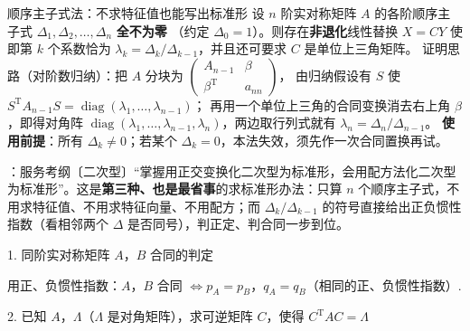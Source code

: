 \begin{fdeep}{顺序主子式法：不求特征值也能写出标准形}
设 $n$ 阶实对称矩阵 $A$ 的各阶顺序主子式 $\Delta_1,\Delta_2,\dots,\Delta_n$ \textbf{全不为零}
（约定 $\Delta_0=1$）。则存在\textbf{非退化}线性替换 $X=CY$ 使
即第 $k$ 个系数恰为 $\lambda_k=\Delta_k/\Delta_{k-1}$，并且还可要求 $C$ 是单位上三角矩阵。
证明思路（对阶数归纳）：把 $A$ 分块为 $\begin{pmatrix}A_{n-1}&\beta\\ \beta^{\mathrm T}&a_{nn}\end{pmatrix}$，
由归纳假设有 $S$ 使 $S^{\mathrm T}A_{n-1}S=\operatorname{diag}(\lambda_1,\dots,\lambda_{n-1})$；
再用一个单位上三角的合同变换消去右上角 $\beta$，即得对角阵
$\operatorname{diag}(\lambda_1,\dots,\lambda_{n-1},\lambda_n)$，两边取行列式就有
$\lambda_n=\Delta_n/\Delta_{n-1}$。
\textbf{使用前提}：所有 $\Delta_k\ne0$；若某个 $\Delta_k=0$，本法失效，须先作一次合同置换再试。

\fbref{}：服务考纲〔二次型〕“掌握用正交变换化二次型为标准形，会用配方法化二次型为标准形”。这是\textbf{第三种、也是最省事}的求标准形办法：只算 $n$ 个顺序主子式，不用求特征值、不用求特征向量、不用配方；而 $\Delta_k/\Delta_{k-1}$ 的符号直接给出正负惯性指数（看相邻两个 $\Delta$ 是否同号），判正定、判合同一步到位。
\end{fdeep}


1. 同阶实对称矩阵 $A$，$B$ 合同的判定

用正、负惯性指数：$A$，$B$ 合同 $\iff p_A=p_B$，$q_A=q_B$（相同的正、负惯性指数）.

2. 已知 $A$，$\Lambda$（$\Lambda$ 是对角矩阵），求可逆矩阵 $C$，使得 $C^{\mathrm T}AC=\Lambda$

